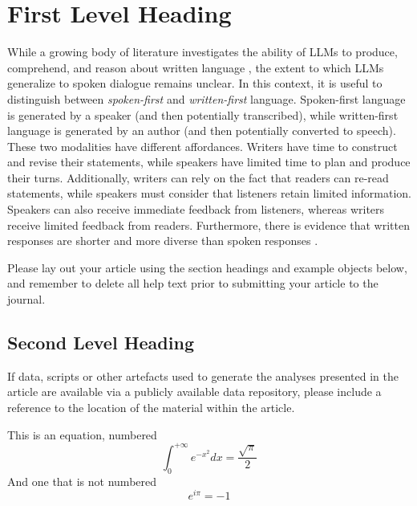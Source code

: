 \section{First Level Heading}
While a growing body of literature investigates the ability of LLMs to produce, comprehend, and reason about written language \citep{srivastava2022beyond, qiao-etal-2023-reasoning, binz2023using}, the extent to which LLMs generalize to spoken dialogue remains unclear. In this context, it is useful to distinguish between \emph{spoken-first} and \emph{written-first} language. Spoken-first language is generated by a speaker (and then potentially transcribed), while written-first language is generated by an author (and then potentially converted to speech). These two modalities have different affordances. Writers have time to construct and revise their statements, while speakers have limited time to plan and produce their turns. Additionally, writers can rely on the fact that readers can re-read statements, while speakers must consider that listeners retain limited information. Speakers can also receive immediate feedback from listeners, whereas writers receive limited feedback from readers. Furthermore, there is evidence that written responses are shorter and more diverse than spoken responses \citep{drieman1962differences}.

\cite{warnke2022speech}
Please lay out your article using the section headings and example objects below, and remember to delete all help text prior to submitting your article to the journal.


\subsection{Second Level Heading}
If data, scripts or other artefacts used to generate the analyses presented in the article are available via a publicly available data repository, please include a reference to the location of the material within the article.

This is an equation, numbered
\begin{equation}
       \int_0^{+\infty}e^{-x^2}dx=\frac{\sqrt{\pi}}{2}
\end{equation}
And one that is not numbered
\begin{equation*}
       e^{i\pi}=-1
\end{equation*}

